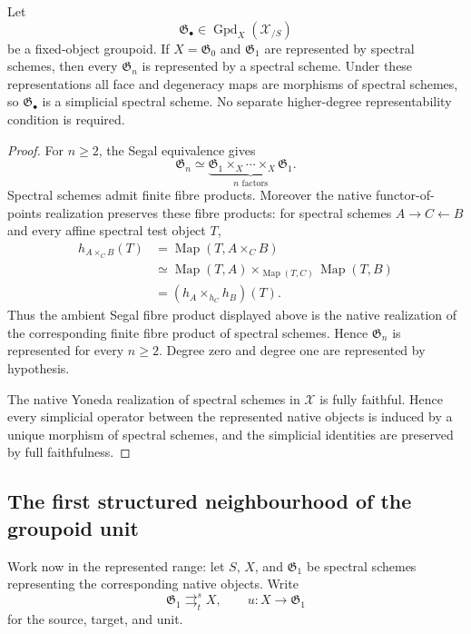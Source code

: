 \begin{proposition}
\label{prop:represented-groupoid-segal}
Let
\[
    \mathfrak G_\bullet\in
    \operatorname{Gpd}_X(\mathcal X_{/S})
\]
be a fixed-object groupoid.  If $X=\mathfrak G_0$ and $\mathfrak G_1$ are
represented by spectral schemes, then every $\mathfrak G_n$ is represented by
a spectral scheme.  Under these representations all face and degeneracy maps
are morphisms of spectral schemes, so $\mathfrak G_\bullet$ is a simplicial
spectral scheme.  No separate higher-degree representability condition is
required.
\end{proposition}

\begin{proof}
For $n\geq2$, the Segal equivalence gives
\[
    \mathfrak G_n
    \simeq
    \underbrace{
    \mathfrak G_1\times_X\cdots\times_X\mathfrak G_1
    }_{n\text{ factors}}.
\]
Spectral schemes admit finite fibre products.  Moreover the native
functor-of-points realization preserves these fibre products: for spectral
schemes $A\to C\leftarrow B$ and every affine spectral test object $T$,
\[
\begin{aligned}
    h_{A\times_C B}(T)
    &=
    \operatorname{Map}(T,A\times_C B)\\
    &\simeq
    \operatorname{Map}(T,A)
    \times_{\operatorname{Map}(T,C)}
    \operatorname{Map}(T,B)\\
    &=
    \left(h_A\times_{h_C}h_B\right)(T).
\end{aligned}
\]
Thus the ambient Segal fibre product displayed above is the native realization
of the corresponding finite fibre product of spectral schemes.  Hence
$\mathfrak G_n$ is represented for every $n\geq2$.  Degree zero and degree one
are represented by hypothesis.

The native Yoneda realization of spectral schemes in $\mathcal X$ is fully
faithful.  Hence every simplicial operator between the represented native
objects is induced by a unique morphism of spectral schemes, and the
simplicial identities are preserved by full faithfulness.
\end{proof}

\subsection{The first structured neighbourhood of the groupoid unit}

Work now in the represented range: let $S$, $X$, and $\mathfrak G_1$ be
spectral schemes representing the corresponding native objects.  Write
\[
    \mathfrak G_1
    \mathop{\rightrightarrows}^{s}_{t}
    X,
    \qquad
    u:X\longrightarrow\mathfrak G_1
\]
for the source, target, and unit.

